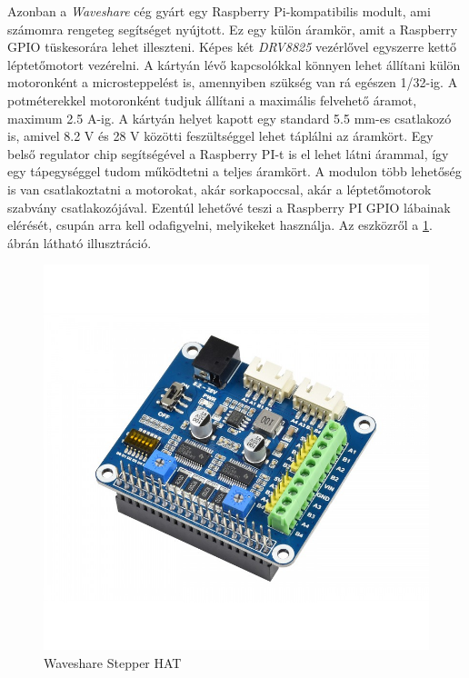 \documentclass[12pt,a4paper]{article}
\begin{document}
Azonban a \textsl{Waveshare} cég gyárt egy Raspberry Pi-kompatibilis modult, ami számomra rengeteg segítséget nyújtott. Ez egy külön áramkör, amit a Raspberry GPIO tüskesorára lehet illeszteni. Képes két \textsl{DRV8825} vezérlővel egyszerre kettő léptetőmotort vezérelni. A kártyán lévő kapcsolókkal könnyen lehet állítani külön motoronként a microsteppelést is, amennyiben szükség van rá egészen 1/32-ig. A potméterekkel motoronként tudjuk állítani a maximális felvehető áramot, maximum 2.5 A-ig. A kártyán helyet kapott egy standard 5.5 mm-es csatlakozó is, amivel 8.2 V és 28 V közötti feszültséggel lehet táplálni az áramkört. Egy belső regulator chip segítségével a Raspberry PI-t is el lehet látni árammal, így egy tápegységgel tudom működtetni a teljes áramkört. A modulon több lehetőség is van csatlakoztatni a motorokat, akár sorkapoccsal, akár a léptetőmotorok szabvány csatlakozójával. Ezentúl lehetővé teszi a Raspberry PI GPIO lábainak elérését, csupán arra kell odafigyelni, melyikeket használja. Az eszközről a \ref{fig:elek_stepperhat}. ábrán látható illusztráció. \cite{stepperhat}

\begin{figure}[h!]
	\centering
	\includegraphics[width=1\linewidth]{elek_stepperhat}
	\caption{Waveshare Stepper HAT}
	\label{fig:elek_stepperhat}
\end{figure}
\end{document}
